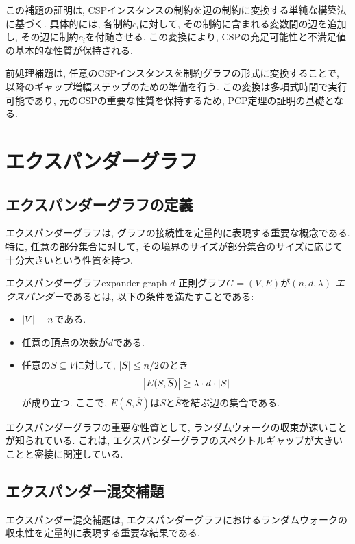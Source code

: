 この補題の証明は, CSPインスタンスの制約を辺の制約に変換する単純な構築法に基づく. 具体的には, 各制約$c_i$に対して, その制約に含まれる変数間の辺を追加し, その辺に制約$c_i$を付随させる. この変換により, CSPの充足可能性と不満足値の基本的な性質が保持される.

前処理補題は, 任意のCSPインスタンスを制約グラフの形式に変換することで, 以降のギャップ増幅ステップのための準備を行う. この変換は多項式時間で実行可能であり, 元のCSPの重要な性質を保持するため, PCP定理の証明の基礎となる.

\section{エクスパンダーグラフ}
\subsection{エクスパンダーグラフの定義}

エクスパンダーグラフは, グラフの接続性を定量的に表現する重要な概念である. 特に, 任意の部分集合に対して, その境界のサイズが部分集合のサイズに応じて十分大きいという性質を持つ.

\begin{definition}{エクスパンダーグラフ}{expander-graph}
  $d$-正則グラフ$G=(V,E)$が\emph{$(n,d,\lambda)$-エクスパンダー}であるとは, 以下の条件を満たすことである:
  \begin{itemize}
  \item $\abs{V}=n$である.
  \item 任意の頂点の次数が$d$である.
  \item 任意の$S\subseteq V$に対して, $\abs{S}\le n/2$のとき
    \begin{align*}
      \abs{E(S,\overline{S})} \ge \lambda \cdot d \cdot \abs{S}
    \end{align*}
    が成り立つ. ここで, $E(S,\overline{S})$は$S$と$\overline{S}$を結ぶ辺の集合である.
  \end{itemize}
\end{definition}

エクスパンダーグラフの重要な性質として, ランダムウォークの収束が速いことが知られている. これは, エクスパンダーグラフのスペクトルギャップが大きいことと密接に関連している.

\subsection{エクスパンダー混交補題}

エクスパンダー混交補題は, エクスパンダーグラフにおけるランダムウォークの収束性を定量的に表現する重要な結果である.

